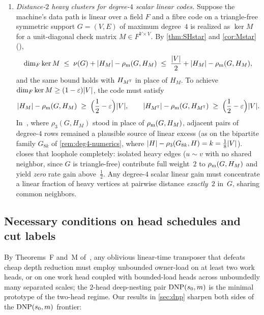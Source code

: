 \begin{enumerate}[label=(N\arabic*),leftmargin=3em]
\item\label{it:con-N2} \emph{Distance-$2$ heavy clusters for degree-$4$ scalar linear codes.} Suppose the machine's data
  path is linear over a field $F$ and a fibre code on a triangle-free symmetric support $G = (V, E)$ of maximum degree~$4$
  is realized as $\ker M$ for a unit-diagonal check matrix $M \in F^{V \times V}$. By \cref{thm:SHstar} and
  \cref{cor:Mstar} (),
  \[
    \dim_F \ker M \;\le\; \nu(G) + \lvert H_M \rvert - \rho_{\mathrm{m}}(G, H_M) \;\le\; \frac{\lvert V \rvert}{2} + \lvert H_M \rvert - \rho_{\mathrm{m}}(G, H_M),
  \]
  and the same bound holds with $H_{M^{\mathsf{T}}}$ in place of $H_M$. To achieve $\dim_F \ker M \ge (1 - \varepsilon)\lvert V \rvert$, the
  code must satisfy
  \[
    \lvert H_M \rvert - \rho_{\mathrm{m}}(G, H_M) \;\ge\; \Bigl(\frac{1}{2} - \varepsilon\Bigr)\lvert V \rvert, \qquad
    \lvert H_{M^{\mathsf{T}}} \rvert - \rho_{\mathrm{m}}(G, H_{M^{\mathsf{T}}}) \;\ge\; \Bigl(\frac{1}{2} - \varepsilon\Bigr)\lvert V \rvert.
  \]
  In~\cite{EighthPaper2026}, where $\rho_3(G, H_M)$ stood in place of $\rho_{\mathrm{m}}(G, H_M)$, adjacent pairs of degree-$4$ rows
  remained a plausible source of linear excess (as on the bipartite family $G_{8k}$ of \cref{rem:deg4-numerics}, where
  $\lvert H \rvert - \rho_3(G_{8k}, H) = k = \tfrac{1}{8}\lvert V \rvert$).  closes that loophole completely: isolated
  heavy edges ($u \sim v$ with no shared neighbor, since $G$ is triangle-free) contribute full weight~$2$ to
  $\rho_{\mathrm{m}}(G, H_M)$ and yield \emph{zero} rate gain above~$\tfrac{1}{2}$. Any degree-$4$ scalar linear gain must concentrate
  a linear fraction of heavy vertices at pairwise distance \emph{exactly~$2$} in~$G$, sharing common neighbors.
\end{enumerate}

\subsection{Necessary conditions on head schedules and cut labels}\label{sec:con-walks}

By Theorems~F and~M of~\cite{EighthPaper2026}, any oblivious linear-time transposer that defeats cheap depth reduction must
employ unbounded owner-load on at least two work heads, or on one work head coupled with bounded-load heads across
unboundedly many separated scales; the $2$-head deep-nesting pair $\mathrm{DNP}(s_0, m)$ is the minimal prototype of the two-head
regime. Our results in \cref{sec:dnp} sharpen both sides of the $\mathrm{DNP}(s_0, m)$ frontier:

